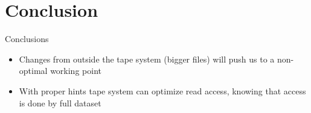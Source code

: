 \documentclass[aspectratio=149]{beamer}
\begin{document}
\section{Conclusion}
\begin{frame}{Conclusions}
\begin{itemize}
  \item Changes from outside the tape system (bigger files) will push us to a non-optimal working point
  \item With proper hints tape system can optimize read access, knowing that access is done by full dataset
\end{itemize}
\end{frame}

\backcover
\end{document}
